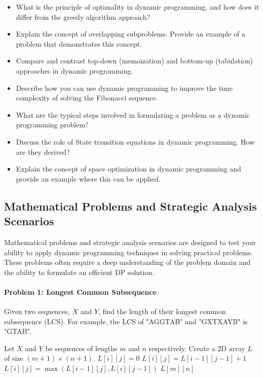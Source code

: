\documentclass[12pt]{book} %
\begin{document}
\begin{itemize}
    \item What is the principle of optimality in dynamic programming, and how does it differ from the greedy algorithm approach?
    \item Explain the concept of overlapping subproblems. Provide an example of a problem that demonstrates this concept.
    \item Compare and contrast top-down (memoization) and bottom-up (tabulation) approaches in dynamic programming.
    \item Describe how you can use dynamic programming to improve the time complexity of solving the Fibonacci sequence.
    \item What are the typical steps involved in formulating a problem as a dynamic programming problem?
    \item Discuss the role of State transition equations in dynamic programming. How are they derived?
    \item Explain the concept of space optimization in dynamic programming and provide an example where this can be applied.
\end{itemize}

\subsection{Mathematical Problems and Strategic Analysis Scenarios}
Mathematical problems and strategic analysis scenarios are designed to test your ability to apply dynamic programming techniques in solving practical problems. These problems often require a deep understanding of the problem domain and the ability to formulate an efficient DP solution.

\paragraph{Problem 1: Longest Common Subsequence}
Given two sequences, $X$ and $Y$, find the length of their longest common subsequence (LCS). For example, the LCS of "AGGTAB" and "GXTXAYB" is "GTAB".

\begin{algorithm}
\caption{Longest Common Subsequence}
\begin{algorithmic}[1]
\State Let $X$ and $Y$ be sequences of lengths $m$ and $n$ respectively.
\State Create a 2D array $L$ of size $(m+1) \times (n+1)$.
            \State $L[i][j] = 0$
            \State $L[i][j] = L[i-1][j-1] + 1$
        \Else
            \State $L[i][j] = \max(L[i-1][j], L[i][j-1])$
        \EndIf
    \EndFor
\EndFor
\Return $L[m][n]$
\end{algorithmic}
\end{algorithm}
\end{document}

